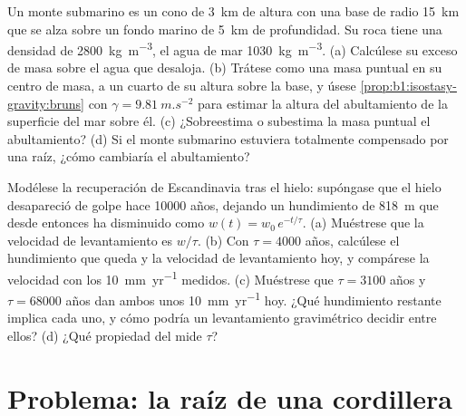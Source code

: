 \begin{exercise}[$\star\star\star$]\label{exo:b1:isostasy-gravity:11}
Un monte submarino es un cono de \qty{3}{km} de altura con una base de radio \qty{15}{km} que se alza sobre un fondo marino de
\qty{5}{km} de profundidad. Su roca tiene una densidad de \qty{2800}{kg.m^{-3}}, el agua de mar \qty{1030}{kg.m^{-3}}. (a) Calcúlese su
exceso de masa sobre el agua que desaloja. (b) Trátese como una masa puntual en su centro de masa, a un cuarto de su altura sobre la
base, y úsese \cref{prop:b1:isostasy-gravity:bruns} con $\gamma = \qty{9.81}{m.s^{-2}}$ para estimar la altura del abultamiento de
la superficie del mar sobre él. (c) ¿Sobreestima o subestima la masa puntual el abultamiento? (d) Si el monte submarino estuviera
totalmente compensado por una raíz, ¿cómo cambiaría el abultamiento?
\end{exercise}

\begin{exercise}[$\star\star\star$]\label{exo:b1:isostasy-gravity:12}
Modélese la recuperación de Escandinavia tras el hielo: supóngase que el hielo desapareció de golpe hace \num{10000} años, dejando un
hundimiento de \qty{818}{m} que desde entonces ha disminuido como $w(t) = w_0\,e^{-t/\tau}$. (a) Muéstrese que la velocidad de
levantamiento es $w/\tau$. (b) Con $\tau = \num{4000}$ años, calcúlese el hundimiento que queda y la velocidad de levantamiento hoy, y
compárese la velocidad con los \qty{10}{mm.yr^{-1}} medidos. (c) Muéstrese que $\tau = \num{3100}$ años y $\tau = \num{68000}$ años dan
ambos unos \qty{10}{mm.yr^{-1}} hoy. ¿Qué hundimiento restante implica cada uno, y cómo podría un levantamiento gravimétrico decidir
entre ellos? (d) ¿Qué propiedad del  mide $\tau$?
\end{exercise}

\section{Problema: la raíz de una cordillera}

